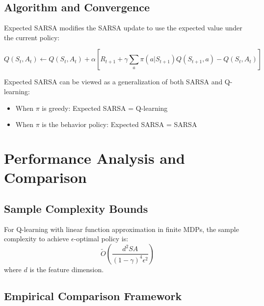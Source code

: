 \subsection{Algorithm and Convergence}

Expected SARSA modifies the SARSA update to use the expected value under the current policy:

\begin{equation}
Q(S_t, A_t) \leftarrow Q(S_t, A_t) + \alpha \left[ R_{t+1} + \gamma \sum_a \pi(a|S_{t+1}) Q(S_{t+1}, a) - Q(S_t, A_t) \right]
\end{equation}

\begin{remarkbox}
Expected SARSA can be viewed as a generalization of both SARSA and Q-learning:
\begin{itemize}
\item When $\pi$ is greedy: Expected SARSA = Q-learning
\item When $\pi$ is the behavior policy: Expected SARSA = SARSA
\end{itemize}
\end{remarkbox}

\section{Performance Analysis and Comparison}

\subsection{Sample Complexity Bounds}

\begin{theorem}
For Q-learning with linear function approximation in finite MDPs, the sample complexity to achieve $\epsilon$-optimal policy is:
\begin{equation}
\tilde{O}\left( \frac{d^2 S A}{(1-\gamma)^4 \epsilon^2} \right)
\end{equation}
where $d$ is the feature dimension.
\end{theorem}

\subsection{Empirical Comparison Framework}

